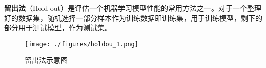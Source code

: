 
\textbf{留出法}（Hold-out）是评估一个机器学习模型性能的常用方法之一。对于一个整理好的数据集，随机选择一部分样本作为训练数据即训练集，用于训练模型，剩下的部分用于测试模型，作为测试集。



\begin{figure}[ht]
\centering
\texttt{[image: ./figures/holdou\_1.png]}
\caption{留出法示意图} \label{holdou_fig1}
\end{figure}